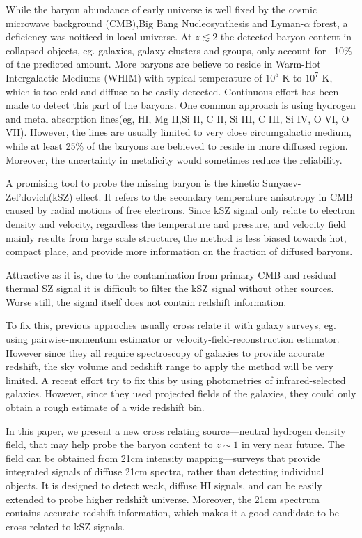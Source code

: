While the baryon abundance of early universe is well fixed by the cosmic microwave background (CMB),Big Bang Nucleosynthesis and Lyman-$\alpha$ forest\cite{Cook14}\cite{Fukugita98}\cite{Komatsu11}\cite{Hinshaw13}, 
a deficiency was noiticed in local universe.
At $z\lesssim 2$ the detected baryon content in collapsed
objects, eg. galaxies, galaxy clusters and groups, only account for ~10$\%$ of the predicted amount.
More baryons are believe to reside in Warm-Hot Intergalactic Mediums (WHIM) with typical temperature of $10^5$ K to $10^7$ K\cite{Soltan06}, which is too cold and diffuse to be easily detected.
Continuous effort has been made to detect this part of the baryons. 
One common approach is using hydrogen and metal absorption lines(eg, HI, Mg II,Si II, C II, Si III, C III, Si IV, O VI, O VII).\cite{Salucci99}\cite{Werk}
However, the lines are usually limited to very close circumgalactic medium, while at least 25\% of the baryons are bebieved to reside in more diffused region\cite{Dave2010}. Moreover, the uncertainty in metalicity would sometimes reduce the reliability.

A promising tool to probe the missing baryon is the kinetic Sunyaev-Zel'dovich(kSZ) effect\cite{Sunyae72}\cite{Sunyaev80}. 
It refers to the secondary temperature anisotropy in CMB caused by radial motions of free electrons.
Since kSZ signal only relate to electron density and velocity, 
regardless the temperature and pressure, 
and velocity field mainly results from large scale structure, 
the method is less biased towards hot, compact place, 
and provide more information on the fraction of diffused baryons.

Attractive as it is, 
due to the contamination from primary CMB and residual thermal SZ signal
it is difficult to filter the kSZ signal without other sources. 
Worse still, the signal itself does not contain redshift information.

To fix this, previous approches usually cross relate it with galaxy surveys, 
eg. using pairwise-momentum estimator\cite{Hand2012} or velocity-field-reconstruction estimator\cite{Shao2011}\cite{Li2014}. 
However since they all require spectroscopy of galaxies to provide accurate redshift, the sky volume and redshift range to apply the method will be very limited. 
A recent effort try to fix this by using photometries of infrared-selected galaxies. 
However, since they used projected fields of the galaxies, they could only obtain a rough estimate of a wide redshift bin\cite{Hill2016}.

In this paper, we present a new cross relating source---neutral hydrogen density field, 
that may help probe the baryon content to $z\sim1$ in very near future.
The field can be obtained from 21cm intensity mapping---surveys that provide integrated signals of diffuse 21cm spectra, 
rather than detecting individual objects. 
It is designed to detect weak, diffuse HI signals, and can be easily extended to probe higher redshift universe.
Moreover, the 21cm spectrum contains accurate redshift information, which makes it a good candidate to be cross related to kSZ signals.

